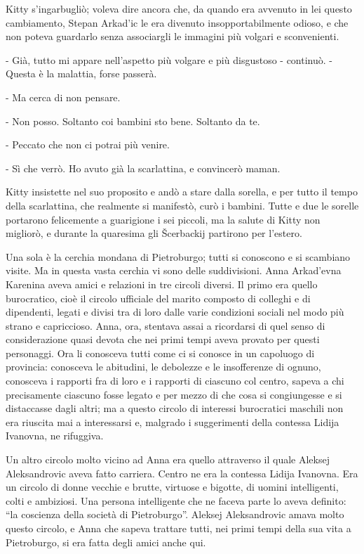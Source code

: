 Kitty s'ingarbugliò; voleva dire ancora che, da quando era avvenuto in lei questo cambiamento, Stepan Arkad'ic le era divenuto insopportabilmente odioso, e che non poteva guardarlo senza associargli le immagini più volgari e sconvenienti. 

- Già, tutto mi appare nell'aspetto più volgare e più disgustoso - continuò. - Questa è la malattia, forse passerà. 

- Ma cerca di non pensare. 

- Non posso. Soltanto coi bambini sto bene. Soltanto da te. 

- Peccato che non ci potrai più venire. 

- Sì che verrò. Ho avuto già la scarlattina, e convincerò maman. 

Kitty insistette nel suo proposito e andò a stare dalla sorella, e per tutto il tempo della scarlattina, che realmente si manifestò, curò i bambini. Tutte e due le sorelle portarono felicemente a guarigione i sei piccoli, ma la salute di Kitty non migliorò, e durante la quaresima gli Šcerbackij partirono per l'estero. 

Una sola è la cerchia mondana di Pietroburgo; tutti si conoscono e si scambiano visite. Ma in questa vasta cerchia vi sono delle suddivisioni. Anna Arkad'evna Karenina aveva amici e relazioni in tre circoli diversi. Il primo era quello burocratico, cioè il circolo ufficiale del marito composto di colleghi e di dipendenti, legati e divisi tra di loro dalle varie condizioni sociali nel modo più strano e capriccioso. Anna, ora, stentava assai a ricordarsi di quel senso di considerazione quasi devota che nei primi tempi aveva provato per questi personaggi. Ora li conosceva tutti come ci si conosce in un capoluogo di provincia: conosceva le abitudini, le debolezze e le insofferenze di ognuno, conosceva i rapporti fra di loro e i rapporti di ciascuno col centro, sapeva a chi precisamente ciascuno fosse legato e per mezzo di che cosa si congiungesse e si distaccasse dagli altri; ma a questo circolo di interessi burocratici maschili non era riuscita mai a interessarsi e, malgrado i suggerimenti della contessa Lidija Ivanovna, ne rifuggiva. 

Un altro circolo molto vicino ad Anna era quello attraverso il quale Aleksej Aleksandrovic aveva fatto carriera. Centro ne era la contessa Lidija Ivanovna. Era un circolo di donne vecchie e brutte, virtuose e bigotte, di uomini intelligenti, colti e ambiziosi. Una persona intelligente che ne faceva parte lo aveva definito: ``la coscienza della società di Pietroburgo''. Aleksej Aleksandrovic amava molto questo circolo, e Anna che sapeva trattare tutti, nei primi tempi della sua vita a Pietroburgo, si era fatta degli amici anche qui. 

